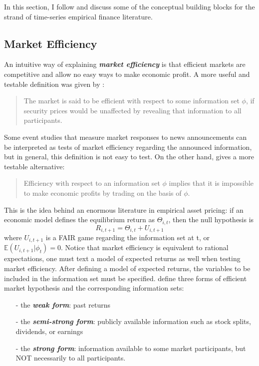 In this section, I follow \citet[Chapter~5]{campbell2017financial} and discuss some 
of the conceptual building blocks for the strand of time-series empirical finance literature.

\subsection{Market Efficiency}
An intuitive way of explaining \textbf{\textit{market efficiency}} is that efficient markets
are competitive and allow no easy ways to make economic profit. A more useful and testable
definition was given by \citet[p.~127]{malkiel1989efficient}:

\begin{quote}
    The market is said to be efficient with respect to some information set $\phi$,
    if security prices would be unaffected by revealing that information to all participants.
\end{quote}

Some event studies that measure market responses to news announcements can be interpreted
as tests of market efficiency regarding the announced information, but in general, this 
definition is not easy to test. On the other hand, \cite{malkiel1989efficient} gives a more testable alternative:
\begin{quote}
    Efficiency with respect to an information set $\phi$ implies that it is impossible to
    make economic profits by trading on the basis of $\phi$.
\end{quote}

This is the idea behind an enormous literature in empirical asset pricing: if an economic model
defines the equilibrium return as $\Theta_{i,t}$, then the null hypothesis is
\begin{equation}
    R_{i,t+1} = \Theta_{i,t}+U_{i,t+1}
\end{equation}
where $U_{i,t+1}$ is a FAIR game regarding the information set at t, or $\mathbb{E}(U_{i,t+1}|\phi_t)=0$.
Notice that market efficiency is equivalent to rational expectations, one must text a model of
expected returns as well when testing market efficiency. After defining a model of expected returns,
the variables to be included in the information set must be specified. \citet{malkiel1970efficient} define
three forms of efficient market hypothesis and the corresponding information sets:
\begin{enumerate}
    \item[-] the \textbf{\textit{weak form}}: past returns
    \item[-] the \textbf{\textit{semi-strong form}}: publicly available information such as stock splits, dividends, or earnings
    \item[-]  the \textbf{\textit{strong form}}: information available to some market participants, but NOT necessarily to all participants.
\end{enumerate}


